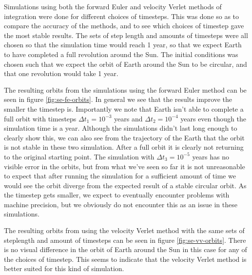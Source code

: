 \documentclass[reprint,english,notitlepage]{revtex4-1}  %
\begin{document}
Simulations using both the forward Euler and velocity Verlet methods of integration were done for different choices of timesteps. This was done so as to compare the accuracy of the methods, and to see which choices of timestep gave the most stable results. The sets of step length and amounts of timesteps were all chosen so that the simulation time would reach 1 year, so that we expect Earth to have completed a full revolution around the Sun. The initial conditions was chosen such that we expect the orbit of Earth around the Sun to be circular, and that one revolution would take 1 year.

The resulting orbits from the simulations using the forward Euler method can be seen in figure \ref{fig:se-fe-orbits}. In general we see that the results improve the smaller the timestep is. Importantly we note that Earth isn't able to complete a full orbit with timesteps $\Delta t_1 = 10^{-3}$ years and $\Delta t_2 = 10^{-4}$ years even though the simulation time is a year. Although the simulations didn't last long enough to clearly show this, we can also see from the trajectory of the Earth that the orbit is not stable in these two simulation. After a full orbit it is clearly not returning to the original starting point. The simulation with $\Delta t_3 = 10^{-5}$ years has no visible error in the orbits, but from what we've seen so far it is not unreasonable to expect that after running the simulation for a sufficient amount of time we would see the orbit diverge from the expected result of a stable circular orbit. As the timestep gets smaller, we expect to eventually encounter problems with machine precision, but we obviously do not encounter this as an issue in these simulations.

The resulting orbits from using the velocity Verlet method with the same sets of steplength and amount of timesteps can be seen in figure \ref{fig:se-vv-orbits}. There is no visual difference in the orbit of Earth around the Sun in this case for any of the choices of timestep. This seems to indicate that the velocity Verlet method is better suited for this kind of simulation.
\end{document}
